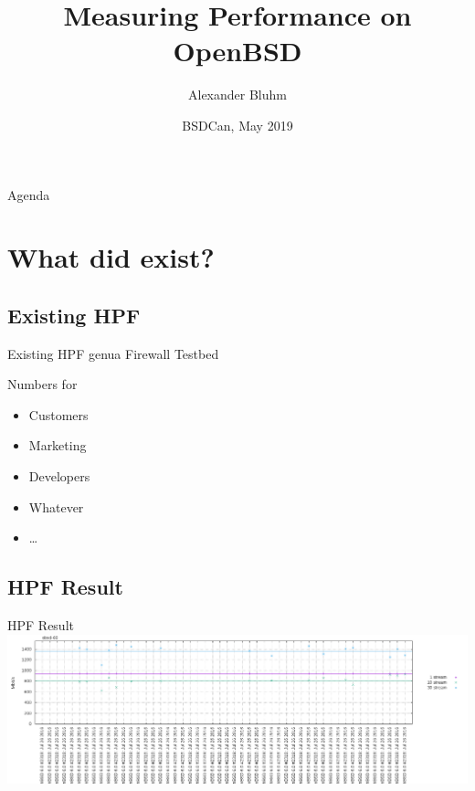 \documentclass[14pt,aspectratio=169]{beamer}
\author{Alexander Bluhm}
\title{Measuring Performance on OpenBSD}
\institute{bluhm@openbsd.org}
\date{BSDCan, May 2019}
\begin{document}
\begin{frame}
\titlepage
\end{frame}

\begin{frame}{Agenda}
\setcounter{tocdepth}{1}
\tableofcontents
\end{frame}

\section{What did exist?}

\subsection{Existing HPF}
\begin{frame}{Existing HPF}
genua Firewall Testbed

Numbers for
\begin{itemize}
    \item Customers
    \item Marketing
    \item Developers
    \item Whatever
    \item \dots
\end{itemize}
\end{frame}

\subsection{HPF Result}
\begin{frame}{HPF Result}
\includegraphics[width=\textwidth]{images/gs700r7_obsd_proxy_tcp.png}
\end{frame}
\end{document}
